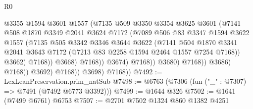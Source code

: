 \begin{lexlean}{R0}
\begin{coremodule}
                                      @3355
                                      @1594
                                      @3601
                                      @1557
                                      (@7135
                                        @509
                                        @3350
                                        @3354
                                        @3625
                                        @3601
                                        (@7141
                                          @508
                                          @1870
                                          @3349
                                          @2041
                                          @3624
                                          @7172
                                          (@7089
                                            @506
                                            @83
                                            @3347
                                            @1594
                                            @3622
                                            @1557
                                            (@7135
                                              @505
                                              @3342
                                              @3346
                                              @3644
                                              @3622
                                              (@7141
                                                @504
                                                @1870
                                                @3341
                                                @2041
                                                @3643
                                                @7172
                                                (@7213 @83 @2258 @1594 @2464 @1557 @7254 @7168))
                                              @3662)
                                            @7168))
                                        @3668)
                                      @7168))
                                  @3674)
                                @7168))
                            @3680)
                          @7168))
                      @3686)
                    @7168))
                @3692)
              @7168))
          @3698)
        @7168))
@7492 := LexLeanPreservation.prim_natSub
@7498 := @6763 (@7306 (fun ("_" : @7307) => @7491 (@7492 @6773 @3392)))
@7499 := @1644 @326
@7502 := @1641 (@7499 @6761) @6753
@7507 := @2701 @7502 @1324 @860 @1382 @4251

\end{coremodule}
\end{lexlean}
